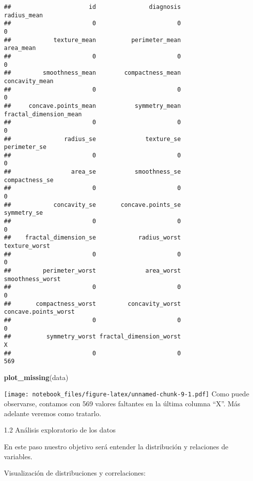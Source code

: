 \documentclass[
]{article}
\newenvironment{Shaded}{\begin{snugshade}}{\end{snugshade}}
\newcommand{\FunctionTok}[1]{\textcolor[rgb]{0.13,0.29,0.53}{\textbf{#1}}}
\newcommand{\NormalTok}[1]{#1}
\begin{document}
\begin{verbatim}
##                      id               diagnosis             radius_mean 
##                       0                       0                       0 
##            texture_mean          perimeter_mean               area_mean 
##                       0                       0                       0 
##         smoothness_mean        compactness_mean          concavity_mean 
##                       0                       0                       0 
##     concave.points_mean           symmetry_mean  fractal_dimension_mean 
##                       0                       0                       0 
##               radius_se              texture_se            perimeter_se 
##                       0                       0                       0 
##                 area_se           smoothness_se          compactness_se 
##                       0                       0                       0 
##            concavity_se       concave.points_se             symmetry_se 
##                       0                       0                       0 
##    fractal_dimension_se            radius_worst           texture_worst 
##                       0                       0                       0 
##         perimeter_worst              area_worst        smoothness_worst 
##                       0                       0                       0 
##       compactness_worst         concavity_worst    concave.points_worst 
##                       0                       0                       0 
##          symmetry_worst fractal_dimension_worst                       X 
##                       0                       0                     569
\end{verbatim}

\begin{Shaded}
\begin{Highlighting}[]
\FunctionTok{plot\_missing}\NormalTok{(data)}
\end{Highlighting}
\end{Shaded}

\texttt{[image: notebook\_files/figure-latex/unnamed-chunk-9-1.pdf]} Como
puede observarse, contamos con 569 valores faltantes en la última
columna ``X''. Más adelante veremos como tratarlo.

1.2 Análisis exploratorio de los datos

En este paso nuestro objetivo será entender la distribución y relaciones
de variables.

Visualización de distribuciones y correlaciones:
\end{document}
